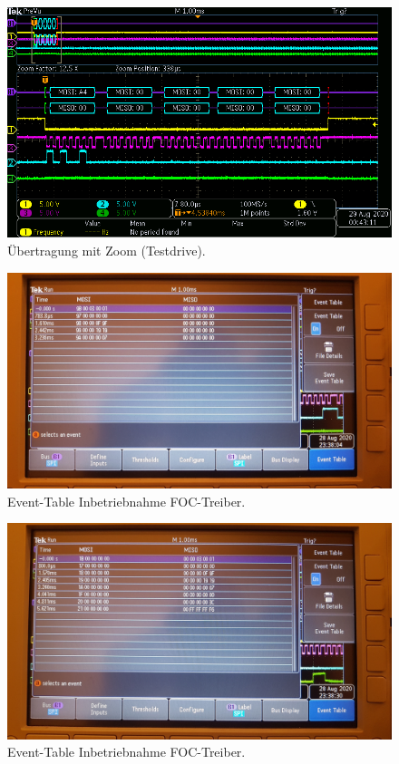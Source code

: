 \begin{figure}[H]
\center
\includegraphics[width = \textwidth]{graphics/TMC4671_TestDrive4}
\caption{Übertragung mit Zoom (Testdrive).}
\label{fig:TMC4671_TestDrive4}
\end{figure}

\begin{figure}[H]
\center
\includegraphics[width = \textwidth]{graphics/TMC4671_TimeTable_Beschreiben1_Bild}
\caption{Event-Table Inbetriebnahme FOC-Treiber.}
\label{fig:TMC4671_TimeTable_Beschreiben1_Bild}
\end{figure}

\begin{figure}[H]
\center
\includegraphics[width = \textwidth]{graphics/TMC4671_TimeTable_Lesen_Bild}
\caption{Event-Table Inbetriebnahme FOC-Treiber.}
\label{fig:TMC4671_TimeTable_Lesen_Bild}
\end{figure}

